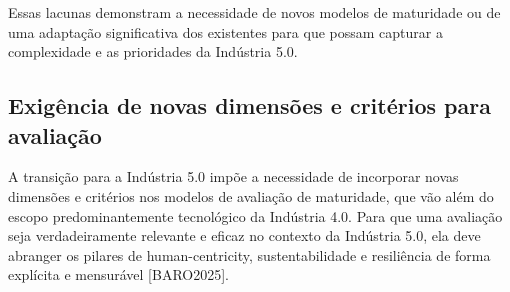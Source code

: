 Essas lacunas demonstram a necessidade de novos modelos de maturidade ou de uma adaptação significativa dos existentes para que possam capturar a complexidade e as prioridades da Indústria 5.0.

\subsection{Exigência de novas dimensões e critérios para avaliação}

A transição para a Indústria 5.0 impõe a necessidade de incorporar novas dimensões e critérios nos modelos de avaliação de maturidade, que vão além do escopo predominantemente tecnológico da Indústria 4.0. Para que uma avaliação seja verdadeiramente relevante e eficaz no contexto da Indústria 5.0, ela deve abranger os pilares de human-centricity, sustentabilidade e resiliência de forma explícita e mensurável [BARO2025].


